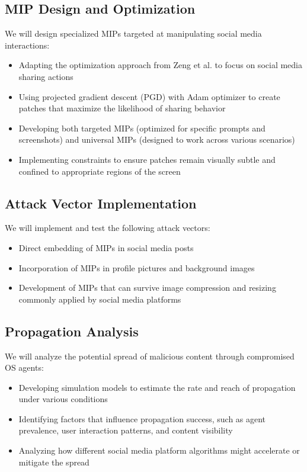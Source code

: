\documentclass[sigconf]{acmart}
\begin{document}
\subsection{MIP Design and Optimization}
We will design specialized MIPs targeted at manipulating social media interactions:
\begin{itemize}
    \item Adapting the optimization approach from Zeng et al. \cite{AttackingMultimodalOSAgentsWithMaliciousImagePatches} to focus on social media sharing actions
    \item Using projected gradient descent (PGD) with Adam optimizer to create patches that maximize the likelihood of sharing behavior
    \item Developing both targeted MIPs (optimized for specific prompts and screenshots) and universal MIPs (designed to work across various scenarios)
    \item Implementing constraints to ensure patches remain visually subtle and confined to appropriate regions of the screen
\end{itemize}

\subsection{Attack Vector Implementation}
We will implement and test the following attack vectors:
\begin{itemize}
    \item Direct embedding of MIPs in social media posts
    \item Incorporation of MIPs in profile pictures and background images
    \item Development of MIPs that can survive image compression and resizing commonly applied by social media platforms
\end{itemize}

\subsection{Propagation Analysis}
We will analyze the potential spread of malicious content through compromised OS agents:
\begin{itemize}
    \item Developing simulation models to estimate the rate and reach of propagation under various conditions
    \item Identifying factors that influence propagation success, such as agent prevalence, user interaction patterns, and content visibility
    \item Analyzing how different social media platform algorithms might accelerate or mitigate the spread
\end{itemize}
\end{document}
